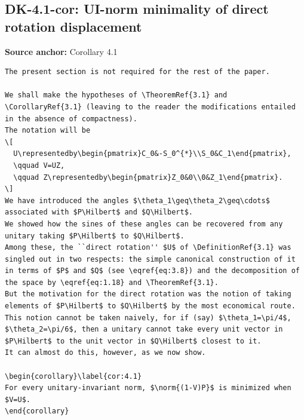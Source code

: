 \subsection*{DK-4.1-cor: UI-norm minimality of direct rotation displacement}
\noindent\textbf{Source anchor:} Corollary 4.1\\
\begin{verbatim}
The present section is not required for the rest of the paper.

We shall make the hypotheses of \TheoremRef{3.1} and \CorollaryRef{3.1} (leaving to the reader the modifications entailed in the absence of compactness).
The notation will be
\[
  U\representedby\begin{pmatrix}C_0&-S_0^{*}\\S_0&C_1\end{pmatrix},
  \qquad V=UZ,
  \qquad Z\representedby\begin{pmatrix}Z_0&0\\0&Z_1\end{pmatrix}.
\]
We have introduced the angles $\theta_1\geq\theta_2\geq\cdots$ associated with $P\Hilbert$ and $Q\Hilbert$.
We showed how the sines of these angles can be recovered from any unitary taking $P\Hilbert$ to $Q\Hilbert$.
Among these, the ``direct rotation'' $U$ of \DefinitionRef{3.1} was singled out in two respects: the simple canonical construction of it in terms of $P$ and $Q$ (see \eqref{eq:3.8}) and the decomposition of the space by \eqref{eq:1.18} and \TheoremRef{3.1}.
But the motivation for the direct rotation was the notion of taking elements of $P\Hilbert$ to $Q\Hilbert$ by the most economical route.
This notion cannot be taken naively, for if (say) $\theta_1=\pi/4$, $\theta_2=\pi/6$, then a unitary cannot take every unit vector in $P\Hilbert$ to the unit vector in $Q\Hilbert$ closest to it.
It can almost do this, however, as we now show.

\begin{corollary}\label{cor:4.1}
For every unitary-invariant norm, $\norm{(1-V)P}$ is minimized when $V=U$.
\end{corollary}
\end{verbatim}

